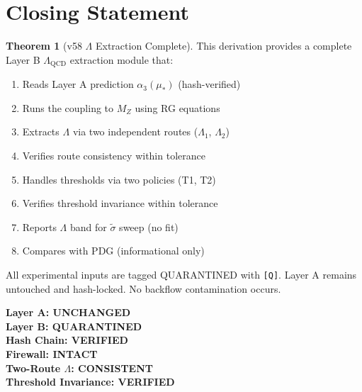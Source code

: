 \documentclass[11pt,a4paper]{article}
\theoremstyle{definition}
\newtheorem{theorem}{Theorem}[section]
\begin{document}
\section{Closing Statement}
\label{sec:closing}

\begin{theorem}[v58 $\Lambda$ Extraction Complete]
\label{thm:v58-complete}
This derivation provides a complete Layer B $\Lambda_{\text{QCD}}$ extraction
module that:
\begin{enumerate}
  \item Reads Layer A prediction $\alpha_3(\mu_*)$ (hash-verified)
  \item Runs the coupling to $M_Z$ using RG equations
  \item Extracts $\Lambda$ via two independent routes ($\Lambda_1$, $\Lambda_2$)
  \item Verifies route consistency within tolerance
  \item Handles thresholds via two policies (T1, T2)
  \item Verifies threshold invariance within tolerance
  \item Reports $\Lambda$ band for $\tilde{\sigma}$ sweep (no fit)
  \item Compares with PDG (informational only)
\end{enumerate}

All experimental inputs are tagged QUARANTINED with \texttt{[Q]}.
Layer A remains untouched and hash-locked.
No backflow contamination occurs.
\end{theorem}

\begin{firewallbox}
\begin{center}
\textbf{Layer A: UNCHANGED} \\
\textbf{Layer B: QUARANTINED} \\
\textbf{Hash Chain: VERIFIED} \\
\textbf{Firewall: INTACT} \\
\textbf{Two-Route $\Lambda$: CONSISTENT} \\
\textbf{Threshold Invariance: VERIFIED}
\end{center}
\end{firewallbox}

\end{document}
